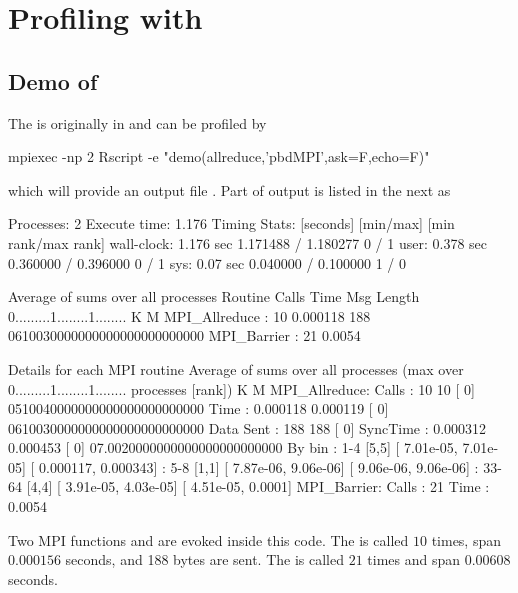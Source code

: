\section{Profiling with }
\label{sec:ex_fpmpi}


\subsection{Demo of }

The  is originally in  and can be profiled
by
\begin{Code}
mpiexec -np 2 Rscript -e "demo(allreduce,'pbdMPI',ask=F,echo=F)"
\end{Code}
which will provide an output file .
Part of output is listed in the next as
\begin{Output}
Processes:      2
Execute time:   1.176
Timing Stats: [seconds] [min/max]       [min rank/max rank]
  wall-clock: 1.176 sec 1.171488 / 1.180277     0 / 1
        user: 0.378 sec 0.360000 / 0.396000     0 / 1
         sys: 0.07 sec  0.040000 / 0.100000     1 / 0

                  Average of sums over all processes
Routine                 Calls       Time Msg Length    %
                                                    0.........1........1........
                                                              K        M
MPI_Allreduce       :      10   0.000118        188 0610030000000000000000000000
MPI_Barrier         :      21     0.0054        

Details for each MPI routine
                  Average of sums over all processes
                                (max over          0.........1........1........
                                 processes [rank])           K        M
MPI_Allreduce:
        Calls     :         10           10 [   0] 0510040000000000000000000000
        Time      :   0.000118     0.000119 [   0] 0610030000000000000000000000
        Data Sent :        188          188 [   0]
        SyncTime  :   0.000312     0.000453 [   0] 07.0020000000000000000000000
        By bin    : 1-4 [5,5]   [  7.01e-05,  7.01e-05] [  0.000117,  0.000343]
                  : 5-8 [1,1]   [  7.87e-06,  9.06e-06] [  9.06e-06,  9.06e-06]
                  : 33-64       [4,4]   [  3.91e-05,  4.03e-05] [  4.51e-05,    0.0001]
MPI_Barrier:
        Calls     :         21
        Time      :     0.0054
\end{Output}
Two MPI  functions  and  are
evoked inside this  code. The  is called $10$
times, span $0.000156$ seconds, and 188 bytes are sent.
The  is called $21$ times and span $0.00608$ seconds.


